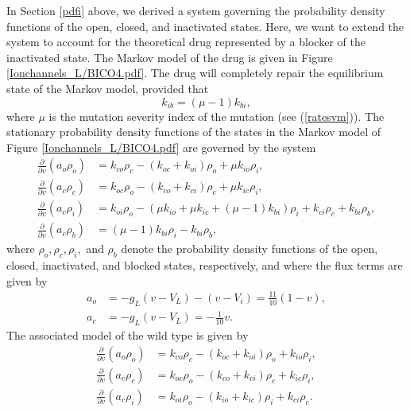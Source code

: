 In Section \ref{pdfi} above, we derived a system governing the probability density
functions of the open, closed, and inactivated states. Here, we want to extend
the system to account for the theoretical drug represented by a blocker of the
inactivated state. The Markov model of the drug is given in Figure \ref{Ionchannels_L/BICO4.pdf}. The drug will
completely repair the equilibrium state of the Markov model, provided that
\begin{equation}
k_{ib}=\left(  \mu-1\right)  k_{bi}\label{kib},%
\end{equation}
where $\mu$ is the mutation severity index of the mutation (see (\ref{ratesvm})). The
stationary probability density functions of the states in the Markov model of
Figure \ref{Ionchannels_L/BICO4.pdf} are governed by the system%
\begin{align}
\frac{\partial}{\partial v}\left(  a_{o}\rho_{o}\right)   &  =k_{co}\rho
_{c}-\left(  k_{oc}+ k_{oi}\right)  \rho_{o}+\mu k_{io}\rho
_{i},\label{bvpdfi1}\\
\frac{\partial}{\partial v}\left(  a_{c}\rho_{c}\right)   &  =k_{oc}\rho
_{o}-\left(  k_{co}+ k_{ci}\right)  \rho_{c}+\mu k_{ic}\rho
_{i},\label{bvpdfi2}\\
\frac{\partial}{\partial v}\left(  a_{c}\rho_{i}\right)   &  = k_{oi}\rho_{o}-(\mu k_{io}+\mu k_{ic}+\left(  \mu-1\right)  k_{bi})\rho_{i}%
+k_{ci}\rho_{c}+k_{bi}\rho_{b},\label{bvpdfi3}\\
\frac{\partial}{\partial v}\left(  a_{c}\rho_{b}\right)   &  =\left(
\mu-1\right)  k_{bi}\rho_{i}-k_{bi}\rho_{b},\label{bvpdfi4}%
\end{align}
where $\rho_{o},\rho_{c},\rho_{i},$ and $\rho_{b}$ denote the probability density
functions of the open, closed, inactivated, and blocked states, respectively, 
and where the flux terms are given by
\begin{align*}
a_{o} &  =-g_{L}\left(  v-V_{L}\right)  -(v-V_{i})=\frac{11}{10}\left(
1-v\right)  ,\\
a_{c} &  =-g_{L}\left(  v-V_{L}\right)  =-\frac{1}{10}v.
\end{align*}
The associated model of the wild type is given by%
\begin{align}
\frac{\partial}{\partial v}\left(  a_{o}\rho_{o}\right)   &  =k_{co}\rho
_{c}-\left(  k_{oc}+k_{oi}\right)  \rho_{o}+k_{io}\rho_{i},\label{pdf100}\\
\frac{\partial}{\partial v}\left(  a_{c}\rho_{c}\right)   &  =k_{oc}\rho
_{o}-\left(  k_{co}+k_{ci}\right)  \rho_{c}+k_{ic}\rho_{i},\label{pdf101}\\
\frac{\partial}{\partial v}\left(  a_{c}\rho_{i}\right)   &  =k_{oi}\rho
_{o}-(k_{io}+k_{ic})\rho_{i}+k_{ci}\rho_{c}.\label{pdf102}%
\end{align}
